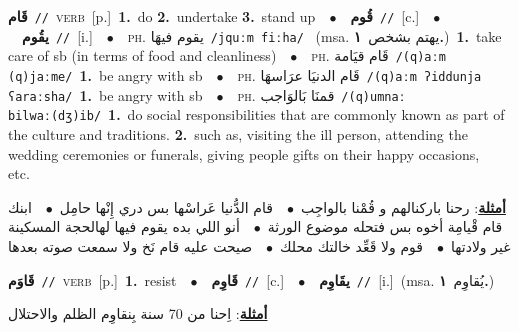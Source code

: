 \documentclass[10pt,a4paper,twoside]{article} %
\begin{document}
\begin{multicols}{2}
{\setlength\topsep{0pt}\textbf{\foreignlanguage{arabic}{قَام}}\ {\color{gray}\texttt{//}\color{black}}\ \textsc{verb}\ [p.]\ \textbf{1.}~do  \textbf{2.}~undertake  \textbf{3.}~stand up\ \ $\bullet$\ \ \setlength\topsep{0pt}\textbf{\foreignlanguage{arabic}{قُوم}}\ {\color{gray}\texttt{//}\color{black}}\ [c.]\ \ $\bullet$\ \ \setlength\topsep{0pt}\textbf{\foreignlanguage{arabic}{يقُوم}}\ {\color{gray}\texttt{//}\color{black}}\ [i.]\ \ $\bullet$\ \ \textsc{ph.} \color{gray} \foreignlanguage{arabic}{يقوم فيهَا}\color{black}\ {\color{gray}\texttt{/{\sffamily jquːm fiːha}/}\color{black}}\ \color{gray} (msa. \foreignlanguage{arabic}{يهتم بشخص}~\foreignlanguage{arabic}{\textbf{١.}})\color{black}\ \textbf{1.}~take care of sb (in terms of food and cleanliness)\ \ $\bullet$\ \ \textsc{ph.} \color{gray} \foreignlanguage{arabic}{قَام قيَامة}\color{black}\ {\color{gray}\texttt{/{\sffamily (q)aːm (q)jaːme}/}\color{black}}\ \textbf{1.}~be angry with sb\ \ $\bullet$\ \ \textsc{ph.} \color{gray} \foreignlanguage{arabic}{قَام الدنيَا عرَاسهَا}\color{black}\ {\color{gray}\texttt{/{\sffamily (q)aːm ʔiddunja ʕaraːsha}/}\color{black}}\ \textbf{1.}~be angry with sb\ \ $\bullet$\ \ \textsc{ph.} \color{gray} \foreignlanguage{arabic}{قمنَا بَالوَاجب}\color{black}\ {\color{gray}\texttt{/{\sffamily (q)umnaː bilwaː(dʒ)ib}/}\color{black}}\ \textbf{1.}~do social responsibilities that are commonly known as part of the culture and traditions.  \textbf{2.}~such as, visiting the ill person, attending the wedding ceremonies or funerals, giving people gifts on their happy occasions, etc.\  \begin{flushright}\color{gray}\foreignlanguage{arabic}{\textbf{\underline{\foreignlanguage{arabic}{أمثلة}}}: رحنا باركنالهم و قُمْنا بالواجِب\ $\bullet$\ \  قام الدُّنيا عَراسْها بس دري إِنْها حامِل\ $\bullet$\ \  ابنك قام قْيامِة أخوه بس فتحله موضوع الورثة\ $\bullet$\ \  أنو اللي بده يقوم فيها لهالحجة المسكينة غير ولادتها\ $\bullet$\ \  قوم ولا قَعِّد خالتك محلك\ $\bullet$\ \  صيحت عليه قام نَخ ولا سمعت صوته بعدها}\end{flushright}\color{black}} \vspace{2mm}

{\setlength\topsep{0pt}\textbf{\foreignlanguage{arabic}{قَاوَم}}\ {\color{gray}\texttt{//}\color{black}}\ \textsc{verb}\ [p.]\ \textbf{1.}~resist\ \ $\bullet$\ \ \setlength\topsep{0pt}\textbf{\foreignlanguage{arabic}{قَاوِم}}\ {\color{gray}\texttt{//}\color{black}}\ [c.]\ \ $\bullet$\ \ \setlength\topsep{0pt}\textbf{\foreignlanguage{arabic}{يقَاوِم}}\ {\color{gray}\texttt{//}\color{black}}\ [i.]\ \color{gray}(msa. \foreignlanguage{arabic}{يُقاوِم}~\foreignlanguage{arabic}{\textbf{١.}})\color{black}\  \begin{flushright}\color{gray}\foreignlanguage{arabic}{\textbf{\underline{\foreignlanguage{arabic}{أمثلة}}}: اِحنا من 70 سنة بِنقاوِم الظلم والاحتلال}\end{flushright}\color{black}} \vspace{2mm}


\end{multicols}
\end{document}
